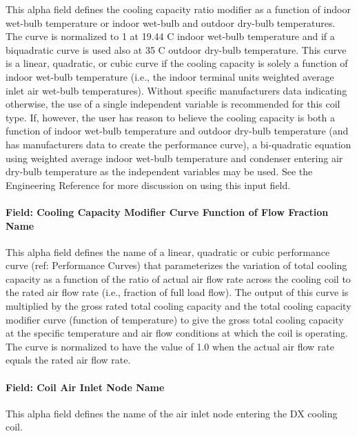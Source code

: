 This alpha field defines the cooling capacity ratio modifier as a function of indoor wet-bulb temperature or indoor wet-bulb and outdoor dry-bulb temperatures. The curve is normalized to 1 at 19.44 C indoor wet-bulb temperature and if a biquadratic curve is used also at 35 C outdoor dry-bulb temperature. This curve is a linear, quadratic, or cubic curve if the cooling capacity is solely a function of indoor wet-bulb temperature (i.e., the indoor terminal units weighted average inlet air wet-bulb temperatures). Without specific manufacturers data indicating otherwise, the use of a single independent variable is recommended for this coil type. If, however, the user has reason to believe the cooling capacity is both a function of indoor wet-bulb temperature and outdoor dry-bulb temperature (and has manufacturers data to create the performance curve), a bi-quadratic equation using weighted average indoor wet-bulb temperature and condenser entering air dry-bulb temperature as the independent variables may be used. See the Engineering Reference for more discussion on using this input field.

\paragraph{Field: Cooling Capacity Modifier Curve Function of Flow Fraction Name}\label{field-cooling-capacity-modifier-curve-function-of-flow-fraction-name}

This alpha field defines the name of a linear, quadratic or cubic performance curve (ref: Performance Curves) that parameterizes the variation of total cooling capacity as a function of the ratio of actual air flow rate across the cooling coil to the rated air flow rate (i.e., fraction of full load flow). The output of this curve is multiplied by the gross rated total cooling capacity and the total cooling capacity modifier curve (function of temperature) to give the gross total cooling capacity at the specific temperature and air flow conditions at which the coil is operating. The curve is normalized to have the value of 1.0 when the actual air flow rate equals the rated air flow rate.

\paragraph{Field: Coil Air Inlet Node Name}\label{field-coil-air-inlet-node-name}

This alpha field defines the name of the air inlet node entering the DX cooling coil.

